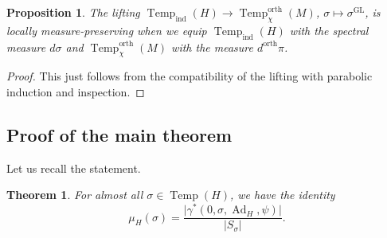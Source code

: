 \documentclass[12pt]{article}
\newtheorem{theo}{Theorem}[section]
\newtheorem{prop}{Proposition}[section]
\numberwithin{equation}{section}
\DeclareMathOperator{\orth}{orth}
\DeclareMathOperator{\Temp}{Temp}
\DeclareMathOperator{\Ad}{Ad}
\DeclareMathOperator{\ind}{ind}
\DeclareMathOperator{\GL}{\mathrm{GL}}
\begin{document}
	
	
	\begin{prop}\label{prop comparison spectral measures}
		The lifting $\Temp_{\ind}(H)\to \Temp_\chi^{\orth}(M)$, $\sigma\mapsto \sigma^{\GL}$, is locally measure-preserving when we equip $\Temp_{\ind}(H)$ with the spectral measure $d\sigma$ and $\Temp_\chi^{\orth}(M)$ with the measure $d^{\orth} \pi$.
	\end{prop}
	
	\begin{proof}
		This just follows from the compatibility of the lifting with parabolic induction and inspection.
	\end{proof}
	
	
	\subsection{Proof of the main theorem}
	
	Let us recall the statement.
	
	\begin{theo}
		For almost all $\sigma\in \Temp(H)$, we have the identity
		$$\displaystyle \mu_H(\sigma)=\frac{\lvert \gamma^*(0,\sigma,\Ad_H,\psi)\rvert}{\lvert S_\sigma\rvert}.$$
	\end{theo}
	
\end{document}
